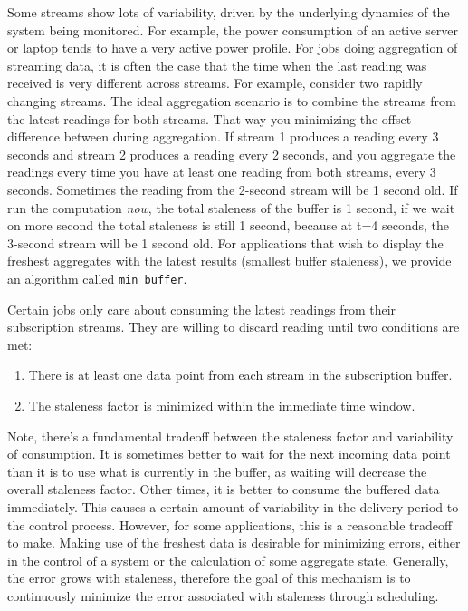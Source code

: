 Some streams show lots of variability, driven by the underlying dynamics of the system being monitored.  For example, the power
consumption of an active server or laptop tends to have a very active power profile.  For jobs doing aggregation of 
streaming data, it is often the case that the time when the last reading was received is very different across streams.  
For example, consider two rapidly changing streams.  The ideal aggregation scenario is to
combine the streams from the latest readings for both streams.  That way you minimizing the offset difference between during aggregation.
If stream 1 produces a reading every 3 seconds and stream 2 produces a reading every 2 seconds, and you aggregate the readings every time you
have at least one reading from both streams, every 3 seconds.  Sometimes the reading from the 2-second stream will be 1 second old.
If run the computation \emph{now}, the total staleness of the buffer is 1 second, if we wait on more second the total staleness is still 1 second, because
at t=4 seconds, the 3-second stream will be 1 second old.
For applications that wish to display the freshest aggregates with the latest results (smallest buffer staleness), we provide an algorithm
called \texttt{min\_buffer}.

Certain jobs only care about consuming the latest readings from their subscription streams.  They are willing to discard reading until two
conditions are met:

\begin{enumerate}
\item There is at least one data point from each stream in the subscription buffer.
\item The staleness factor is minimized within the immediate time window.
\end{enumerate}

Note, there's a fundamental tradeoff
between the staleness factor and variability of consumption.  It is sometimes better to wait for the next incoming data point than it is to use what
is currently in the buffer, as waiting will decrease the overall staleness factor.  Other times, it is better to consume the buffered data immediately.
This causes a certain amount of variability in the delivery period to the control process.  However, for some applications, this is a reasonable tradeoff
to make.  Making use of the freshest data is desirable for minimizing errors, either in the control of a system or the calculation of some aggregate 
state.
Generally, the error grows with staleness, therefore the goal of this mechanism is to continuously minimize the error associated with staleness through
scheduling.


